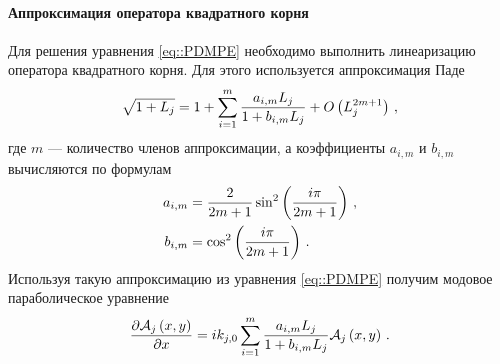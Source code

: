 \documentclass[../document.tex]{subfiles}
\begin{document}
        \paragraph{Аппроксимация оператора квадратного корня}
        \par Для решения уравнения \eqref{eq::PDMPE} необходимо выполнить линеаризацию оператора квадратного корня. Для этого используется аппроксимация Паде \cite{jensen}
        \begin{equation}
            \sqrt{1+L_j}=1+\sum\limits_{i=1}^m\frac{a_{i,m}L_j}{1+b_{i,m}L_j}+O\left(L_j^{2m+1}\right)\,,
        \end{equation}
        где $m$ --- количество членов аппроксимации, а коэффициенты $a_{i,m}$ и $b_{i,m}$ вычисляются по формулам
        \begin{align}
            a_{i,m}&=\frac{2}{2m+1}\sin^2\left(\frac{i\pi}{2m+1}\right)\,,\\
            b_{i,m}&=\cos^2\left(\frac{i\pi}{2m+1}\right)\,.
        \end{align}
        Используя такую аппроксимацию из уравнения \eqref{eq::PDMPE} получим модовое параболическое уравнение
        \begin{equation}
            \frac{\partial\mathcal{A}_j\left(x,y\right)}{\partial x}=ik_{j,0}\sum\limits_{i=1}^m\frac{a_{i,m}L_j}{1+b_{i,m}L_j}\mathcal{A}_j\left(x,y\right)\,.
        \end{equation}
\end{document}

